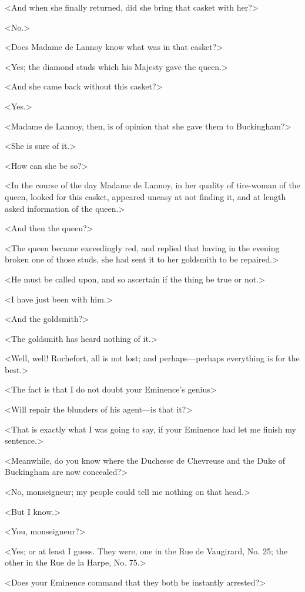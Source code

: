 <And when she finally returned, did she bring that casket with her?> 

<No.> 

<Does Madame de Lannoy know what was in that casket?> 

<Yes; the diamond studs which his Majesty gave the queen.> 

<And she came back without this casket?> 

<Yes.> 

<Madame de Lannoy, then, is of opinion that she gave them to Buckingham?> 

<She is sure of it.> 

<How can she be so?> 

<In the course of the day Madame de Lannoy, in her quality of tire-woman of the queen, looked for this casket, appeared uneasy at not finding it, and at length asked information of the queen.> 

<And then the queen?> 

<The queen became exceedingly red, and replied that having in the evening broken one of those studs, she had sent it to her goldsmith to be repaired.> 

<He must be called upon, and so ascertain if the thing be true or not.> 

<I have just been with him.> 

<And the goldsmith?> 

<The goldsmith has heard nothing of it.> 

<Well, well! Rochefort, all is not lost; and perhaps---perhaps everything is for the best.> 

<The fact is that I do not doubt your Eminence's genius\longdash> 

<Will repair the blunders of his agent---is that it?> 

<That is exactly what I was going to say, if your Eminence had let me finish my sentence.> 

<Meanwhile, do you know where the Duchesse de Chevreuse and the Duke of Buckingham are now concealed?> 

<No, monseigneur; my people could tell me nothing on that head.> 

<But I know.> 

<You, monseigneur?> 

<Yes; or at least I guess. They were, one in the Rue de Vaugirard, No. 25; the other in the Rue de la Harpe, No. 75.> 

<Does your Eminence command that they both be instantly arrested?> 

